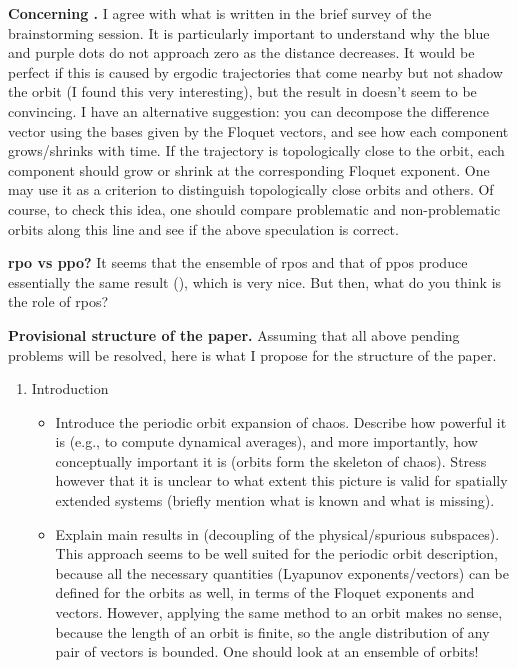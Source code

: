 \begin{description}
\textbf{Concerning .}
I agree with what is written in the brief survey of the brainstorming session.
It is particularly important to understand why the blue and purple dots
 do not approach zero as the distance decreases.
It would be perfect if this is caused by ergodic trajectories that come nearby
 but not shadow the orbit (I found this very interesting), but the result
 in  doesn't seem to be convincing.
I have an alternative suggestion:
 you can decompose the difference vector
 using the bases given by the Floquet vectors,
 and see how each component grows/shrinks with time.
If the trajectory is topologically close to the orbit,
 each component should grow or shrink at the corresponding Floquet exponent.
One may use it as a criterion
 to distinguish topologically close orbits and others.
Of course, to check this idea,
 one should compare problematic and non-problematic orbits along this line
 and see if the above speculation is correct.

\textbf{rpo vs ppo?}
It seems that the ensemble of rpos and that of ppos
 produce essentially the same result (),
 which is very nice.
But then, what do you think is the role of rpos?


\textbf{Provisional structure of the paper.}
Assuming that all above pending problems will be resolved,
 here is what I propose for the structure of the paper.

\begin{enumerate}

\item Introduction
\begin{itemize}
\item Introduce the periodic orbit expansion of chaos.
Describe how powerful it is (e.g., to compute dynamical averages),
 and more importantly, how conceptually important it is
 (orbits form the skeleton of chaos).
Stress however that it is unclear to what extent this picture is valid
 for spatially extended systems
 (briefly mention what is known and what is missing).
\item Explain main results in 
 (decoupling of the physical/spurious subspaces).
This approach seems to be well suited for the periodic orbit description,
 because all the necessary quantities (Lyapunov exponents/vectors)
 can be defined for the orbits as well,
 in terms of the Floquet exponents and vectors.
However, applying the same method to an orbit makes no sense,
 because the length of an orbit is finite,
 so the angle distribution of any pair of vectors is bounded.
One should look at an ensemble of orbits!
\end{itemize}


\end{enumerate}
\end{description}
